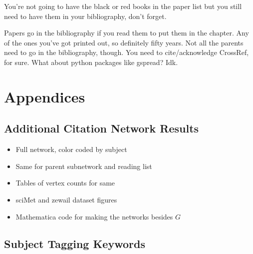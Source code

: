 \documentclass[12pt]{thesis}
\theoremstyle{plain}
\theoremstyle{definition}
\theoremstyle{remark}
\begin{document}
You're not going to have the black or red books in the paper list but you still need to have them in your bibliography, don't forget.

Papers go in the bibliography if you read them to put them in the chapter. Any of the ones you've got printed out, so definitely fifty years. Not all the parents need to go in the bibliography, though. You need to cite/acknowledge CrossRef, for sure. What about python packages like gspread? Idk.








\appendix

\chapter{Appendices}




\section{Additional Citation Network Results}

\begin{itemize}
\item Full network, color coded by subject
\item Same for parent subnetwork and reading list
\item Tables of vertex counts for same
\item sciMet and zewail dataset figures
\item Mathematica code for making the networks besides $G$
\end{itemize}



\section{Subject Tagging Keywords}
\end{document}

